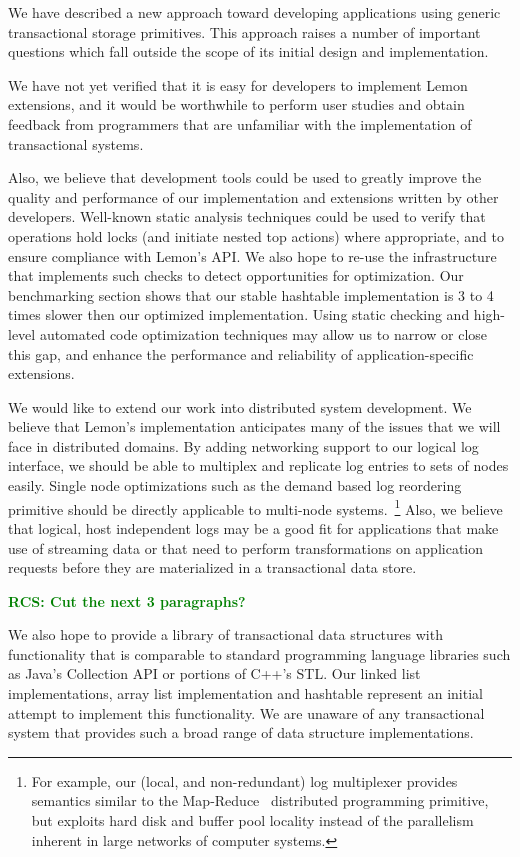 \documentclass[10pt,letterpaper,twocolumn,english]{article}
\newcommand{\yad}{Lemon\xspace}
\newcommand{\rcs}[1]{\textcolor{green}{\bf RCS: #1}}
\begin{document}
We have described a new approach toward developing applications using
generic transactional storage primitives.  This approach raises a
number of important questions which fall outside the scope of its
initial design and implementation.

We have not yet verified that it is easy for developers to implement
\yad extensions, and it would be worthwhile to perform user studies
and obtain feedback from programmers that are unfamiliar with the 
implementation of transactional systems.

Also, we believe that development tools could be used to greatly
improve the quality and performance of our implementation and
extensions written by other developers.  Well-known static analysis
techniques could be used to verify that operations hold locks (and
initiate nested top actions) where appropriate, and to ensure
compliance with \yad's API.  We also hope to re-use the infrastructure
that implements such checks to detect opportunities for
optimization.  Our benchmarking section shows that our stable
hashtable implementation is 3 to 4 times slower then our optimized
implementation.  Using static checking and high-level automated code
optimization techniques may allow us to narrow or close this
gap, and enhance the performance and reliability of application-specific 
extensions.

We would like to extend our work into distributed system
development.  We believe that \yad's implementation anticipates many
of the issues that we will face in distributed domains.  By adding 
networking support to our logical log interface,
we should be able to multiplex and replicate log entries to sets of
nodes easily.  Single node optimizations such as the demand based log
reordering primitive should be directly applicable to multi-node
systems.~\footnote{For example, our (local, and non-redundant) log
multiplexer provides semantics similar to the
Map-Reduce~\cite{mapReduce} distributed programming primitive, but
exploits hard disk and buffer pool locality instead of the parallelism
inherent in large networks of computer systems.}  Also, we believe
that logical, host independent logs may be a good fit for applications
that make use of streaming data or that need to perform
transformations on application requests before they are materialized
in a transactional data store.

\rcs{ Cut the next 3 paragraphs? }

We also hope to provide a library of
transactional data structures with functionality that is comparable to
standard programming language libraries such as Java's Collection API
or portions of C++'s STL.  Our linked list implementations, array list
implementation and hashtable represent an initial attempt to implement
this functionality.  We are unaware of any transactional system that
provides such a broad range of data structure implementations.  
\end{document}
